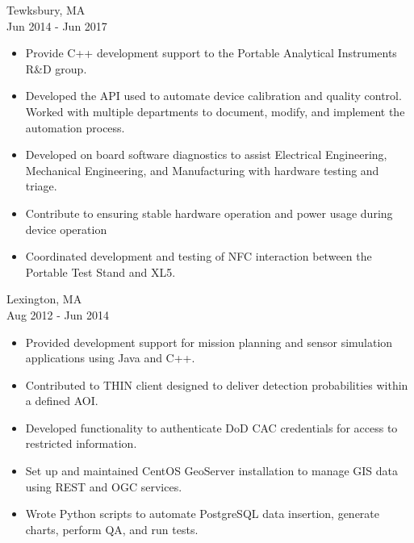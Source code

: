 \documentclass{article}
\begin{document}
 \hfill Tewksbury, MA \\
 \hfill Jun 2014 - Jun 2017
\begin{itemize}
\item Provide C++ development support to the Portable Analytical Instruments R\&D group.
\item Developed the API used to automate device calibration and quality control. Worked with multiple departments to document, modify, and implement the automation process.
\item Developed on board software diagnostics to assist Electrical Engineering, Mechanical Engineering, and Manufacturing with hardware testing and triage.
\item Contribute to ensuring stable hardware operation and power usage during device operation
\item Coordinated development and testing of NFC interaction between the Portable Test Stand and XL5. 
\end{itemize}

 \hfill Lexington, MA \\
 \hfill Aug 2012 - Jun 2014
\begin{itemize}
\item Provided development support for mission planning and sensor simulation applications using Java and C++.
\item Contributed to THIN client designed to deliver detection probabilities within a defined AOI.
\item Developed functionality to authenticate DoD CAC credentials for access to restricted information.
\item Set up and maintained CentOS GeoServer installation to manage GIS data using REST and OGC services.
\item Wrote Python scripts to automate PostgreSQL data insertion, generate charts, perform QA, and run tests.
\end{itemize}
\end{document}
